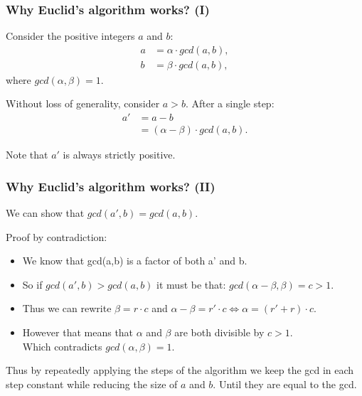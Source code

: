 \documentclass{beamer} %
\begin{document}
\begin{frame}
\frametitle{Why Euclid's algorithm works? (I)}

Consider the positive integers $a$ and $b$:
\begin{align}
a &= \alpha \cdot gcd(a,b), \\
b &= \beta \cdot gcd(a,b),
\end{align}
where $gcd(\alpha, \beta) = 1.$

Without loss of generality, consider $a > b$. After a single step:
\begin{align}
a' &= a - b \\ 
    &= (\alpha - \beta) \cdot gcd(a,b).
\end{align}

Note that $a'$ is always strictly positive.

\end{frame}

\begin{frame}
\frametitle{Why Euclid's algorithm works? (II)}

We can show that $gcd(a', b) = gcd(a,b)$.

Proof by contradiction: 

\begin{itemize}
\item We know that gcd(a,b) is a factor of both a' and b. 
\item So if $gcd(a', b) > gcd(a,b)$ it must be that:
$gcd(\alpha - \beta, \beta) = c > 1$. 
\item Thus we can rewrite $\beta = r \cdot c$ and $\alpha - \beta = r' \cdot c \Leftrightarrow \alpha = (r' + r) \cdot c $. 
\item However that means that $\alpha$ and $\beta$ are both divisible by $c > 1$. \\ Which contradicts $gcd(\alpha, \beta) = 1$.
\end{itemize}

Thus by repeatedly applying the steps of the algorithm we keep the gcd in each step constant while reducing the size of $a$ and $b$. Until they are equal to the gcd.

\end{frame}



\end{document}
